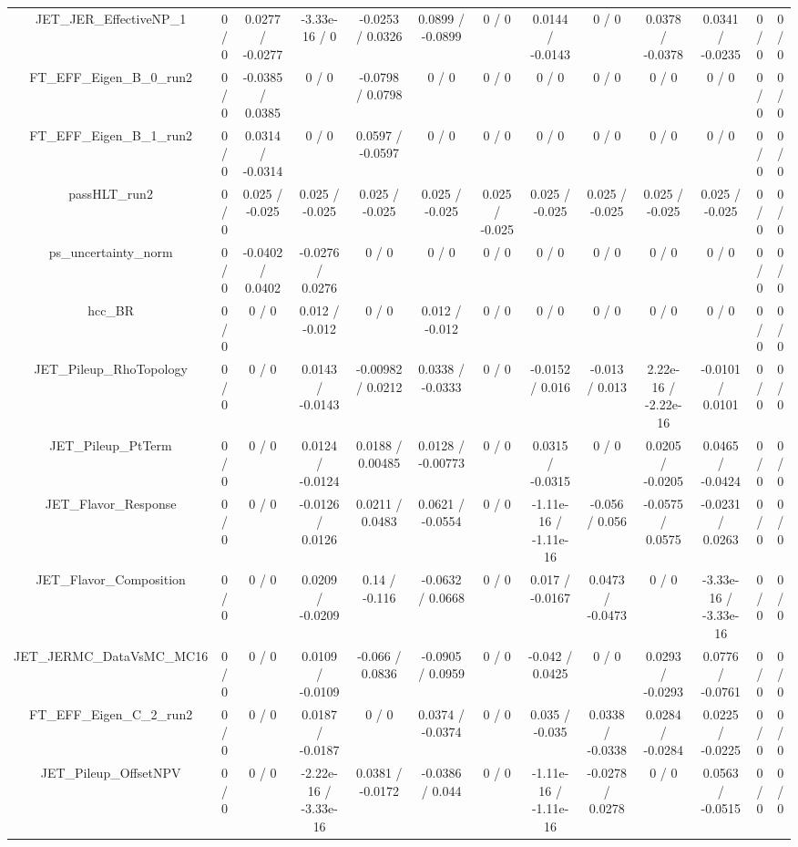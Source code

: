 \documentclass[10pt]{article}
\begin{document}
\begin{table}[htbp]
\begin{center}
\begin{tabular}{|c|c|c|c|c|c|c|c|c|c|c|c|c|}
  JET_JER_EffectiveNP_1 & 0 / 0 & 0.0277 / -0.0277 & -3.33e-16 / 0 & -0.0253 / 0.0326 & 0.0899 / -0.0899 & 0 / 0 & 0.0144 / -0.0143 & 0 / 0 & 0.0378 / -0.0378 & 0.0341 / -0.0235 & 0 / 0 & 0 / 0 \\ 
  FT_EFF_Eigen_B_0_run2 & 0 / 0 & -0.0385 / 0.0385 & 0 / 0 & -0.0798 / 0.0798 & 0 / 0 & 0 / 0 & 0 / 0 & 0 / 0 & 0 / 0 & 0 / 0 & 0 / 0 & 0 / 0 \\ 
  FT_EFF_Eigen_B_1_run2 & 0 / 0 & 0.0314 / -0.0314 & 0 / 0 & 0.0597 / -0.0597 & 0 / 0 & 0 / 0 & 0 / 0 & 0 / 0 & 0 / 0 & 0 / 0 & 0 / 0 & 0 / 0 \\ 
  passHLT_run2 & 0 / 0 & 0.025 / -0.025 & 0.025 / -0.025 & 0.025 / -0.025 & 0.025 / -0.025 & 0.025 / -0.025 & 0.025 / -0.025 & 0.025 / -0.025 & 0.025 / -0.025 & 0.025 / -0.025 & 0 / 0 & 0 / 0 \\ 
  ps_uncertainty_norm & 0 / 0 & -0.0402 / 0.0402 & -0.0276 / 0.0276 & 0 / 0 & 0 / 0 & 0 / 0 & 0 / 0 & 0 / 0 & 0 / 0 & 0 / 0 & 0 / 0 & 0 / 0 \\ 
  hcc_BR & 0 / 0 & 0 / 0 & 0.012 / -0.012 & 0 / 0 & 0.012 / -0.012 & 0 / 0 & 0 / 0 & 0 / 0 & 0 / 0 & 0 / 0 & 0 / 0 & 0 / 0 \\ 
  JET_Pileup_RhoTopology & 0 / 0 & 0 / 0 & 0.0143 / -0.0143 & -0.00982 / 0.0212 & 0.0338 / -0.0333 & 0 / 0 & -0.0152 / 0.016 & -0.013 / 0.013 & 2.22e-16 / -2.22e-16 & -0.0101 / 0.0101 & 0 / 0 & 0 / 0 \\ 
  JET_Pileup_PtTerm & 0 / 0 & 0 / 0 & 0.0124 / -0.0124 & 0.0188 / 0.00485 & 0.0128 / -0.00773 & 0 / 0 & 0.0315 / -0.0315 & 0 / 0 & 0.0205 / -0.0205 & 0.0465 / -0.0424 & 0 / 0 & 0 / 0 \\ 
  JET_Flavor_Response & 0 / 0 & 0 / 0 & -0.0126 / 0.0126 & 0.0211 / 0.0483 & 0.0621 / -0.0554 & 0 / 0 & -1.11e-16 / -1.11e-16 & -0.056 / 0.056 & -0.0575 / 0.0575 & -0.0231 / 0.0263 & 0 / 0 & 0 / 0 \\ 
  JET_Flavor_Composition & 0 / 0 & 0 / 0 & 0.0209 / -0.0209 & 0.14 / -0.116 & -0.0632 / 0.0668 & 0 / 0 & 0.017 / -0.0167 & 0.0473 / -0.0473 & 0 / 0 & -3.33e-16 / -3.33e-16 & 0 / 0 & 0 / 0 \\ 
  JET_JERMC_DataVsMC_MC16 & 0 / 0 & 0 / 0 & 0.0109 / -0.0109 & -0.066 / 0.0836 & -0.0905 / 0.0959 & 0 / 0 & -0.042 / 0.0425 & 0 / 0 & 0.0293 / -0.0293 & 0.0776 / -0.0761 & 0 / 0 & 0 / 0 \\ 
  FT_EFF_Eigen_C_2_run2 & 0 / 0 & 0 / 0 & 0.0187 / -0.0187 & 0 / 0 & 0.0374 / -0.0374 & 0 / 0 & 0.035 / -0.035 & 0.0338 / -0.0338 & 0.0284 / -0.0284 & 0.0225 / -0.0225 & 0 / 0 & 0 / 0 \\ 
  JET_Pileup_OffsetNPV & 0 / 0 & 0 / 0 & -2.22e-16 / -3.33e-16 & 0.0381 / -0.0172 & -0.0386 / 0.044 & 0 / 0 & -1.11e-16 / -1.11e-16 & -0.0278 / 0.0278 & 0 / 0 & 0.0563 / -0.0515 & 0 / 0 & 0 / 0 \\ 

\end{tabular}
\end{center}
\end{table}
\end{document}
